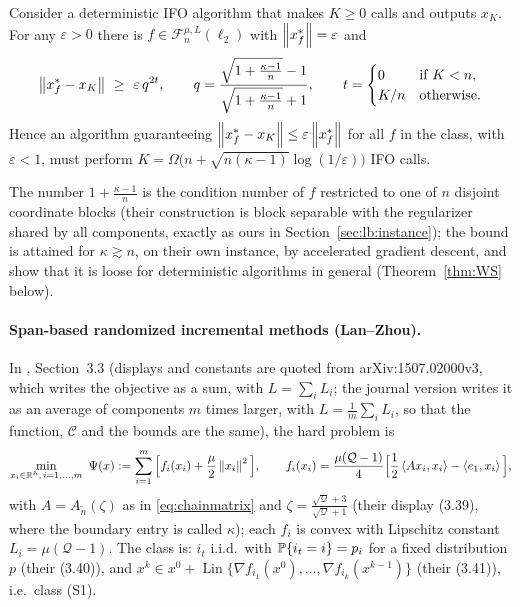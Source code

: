 \begin{theorem}
\label{thm:AB}
Consider a deterministic IFO algorithm that makes $K\ge0$ calls and outputs $x_K$. For any $\varepsilon>0$ there is $f\in\mathcal F_n^{\mu,L}(\ell_2)$ with $\left\|x_f^\ast\right\|=\varepsilon$ and
\[
\norm{x_f^\ast-x_K}\ \ge\ \varepsilon\,q^{2t},\qquad q=\frac{\sqrt{1+\frac{\kappa-1}{n}}-1}{\sqrt{1+\frac{\kappa-1}{n}}+1},\qquad t=\begin{cases}0&\text{if }K<n,\\ K/n&\text{otherwise.}\end{cases}
\]
Hence an algorithm guaranteeing $\left\|x_f^\ast-x_K\right\|\le\varepsilon\left\|x_f^\ast\right\|$ for all $f$ in the class, with $\varepsilon<1$, must perform $K=\Omega\big(n+\sqrt{n(\kappa-1)}\log(1/\varepsilon)\big)$ IFO calls.
\end{theorem}

The number $1+\frac{\kappa-1}{n}$ is the condition number of $f$ restricted to one of $n$ disjoint coordinate blocks (their construction is block separable with the regularizer shared by all components, exactly as ours in Section~\ref{sec:lb:instance}); the bound is attained for $\kappa\gtrsim n$, on their own instance, by accelerated gradient descent, and \cite{woodworth2016tight} show that it is loose for deterministic algorithms in general (Theorem~\ref{thm:WS} below).

\paragraph{Span-based randomized incremental methods (Lan--Zhou).}
In \cite{lan2018optimal}, Section~3.3 (displays and constants are quoted from arXiv:1507.02000v3, which writes the objective as a sum, with $L=\sum_iL_i$; the journal version writes it as an average of components $m$ times larger, with $L=\frac1m\sum_iL_i$, so that the function, $\mathcal C$ and the bounds are the same), the hard problem is
\begin{equation}
\label{eq:LZinstance}
\min_{x_i\in\R^{\tilde n},\,i=1,\dots,m}\ \Psi(x):=\sum_{i=1}^m\Big[f_i(x_i)+\frac{\mu}{2}\norm{x_i}^2\Big],\qquad f_i(x_i)=\frac{\mu(\mathcal Q-1)}{4}\Big[\frac12\inner{Ax_i}{x_i}-\inner{e_1}{x_i}\Big],
\end{equation}
with $A=A_{\tilde n}(\zeta)$ as in \eqref{eq:chainmatrix} and $\zeta=\frac{\sqrt{\mathcal Q}+3}{\sqrt{\mathcal Q}+1}$ (their display (3.39), where the boundary entry is called $\kappa$); each $f_i$ is convex with Lipschitz constant $L_i=\mu(\mathcal Q-1)$. The class is: $i_t$ i.i.d.\ with $\mathbb{P}\{i_t=i\}=p_i$ for a fixed distribution $p$ (their (3.40)), and $x^k\in x^0+\operatorname{Lin}\{\nabla f_{i_1}(x^0),\dots,\nabla f_{i_k}(x^{k-1})\}$ (their (3.41)), i.e.\ class (S1).

